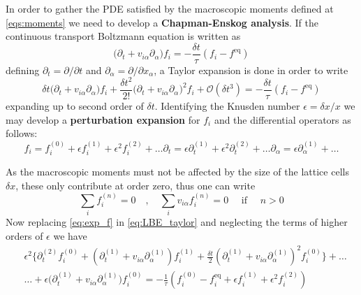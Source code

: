 In order to gather the PDE satisfied by the macroscopic moments defined at \ref{eqs:moments} we need to develop a \textbf{Chapman-Enskog analysis}. If the continuous transport Boltzmann equation is written as 
\begin{equation}\label{eq:C_LBE}
    \bigg(\partial_{t} + v_{i\alpha}\partial_\alpha\bigg)f_i = -\frac{\delta t}{\tau}(f_i - f^{\text{eq}})
\end{equation}
defining $\partial_t = \partial/\partial t$ and $\partial_\alpha = \partial/\partial x_\alpha$, a Taylor expansion is done in order to write
\begin{equation}\label{eq:LBE_taylor}
    \delta t\bigg(\partial_{t} + v_{i\alpha}\partial_\alpha\bigg)f_i + \frac{\delta t^2}{2!}\bigg(\partial_{t} + v_{i\alpha}\partial_\alpha\bigg)^2f_i + \mathcal{O}(\delta t^3) = -\frac{\delta t}{\tau}(f_i - f^{\text{eq}})
\end{equation}
expanding up to second order of $\delta t$. Identifying the Knusden number $\epsilon = \delta x/x$ %
 we may develop a \textbf{perturbation expansion} for $f_i$ and the differential operators as follows:
\begin{subequations}\label{eq:exp_f}
    \begin{equation}
        f_i = f_i^{(0)} + \epsilon f_i^{(1)} + \epsilon^2 f_i^{(2)} + \dots
    \end{equation}
    \begin{equation}
        \partial_t = \epsilon \partial_t^{(1)} + \epsilon^2 \partial_t^{(2)} + \dots
    \end{equation}
    \begin{equation}
        \partial_\alpha = \epsilon \partial_\alpha^{(1)} + \dots
    \end{equation}
\end{subequations}

As the macroscopic moments must not be affected by the size of the lattice cells $\delta x$, these only contribute at order zero, thus one can write
\begin{equation}\label{eqs:moments_order_zero}
    \sum_i f_i^{(n)} = 0 \quad, \quad\sum_i v_{i\alpha}f_i^{(n)} = 0\quad\text{ if }\quad n>0
\end{equation}
Now replacing \ref{eq:exp_f} in \ref{eq:LBE_taylor} and neglecting the terms of higher orders of $\epsilon$ we have
\begin{align}
    &\epsilon^2\bigg\{\partial_t^{(2)}f_i^{(0)}+\left(\partial_t^{(1)}+v_{i\alpha}\partial_{\alpha}^{(1)}\right)f_i^{(1)}+\frac{\delta t}{2}\left(\partial_t^{(1)}+v_{i\alpha}\partial_\alpha^{(1)}\right)^2f_i^{(0)}\bigg\}+\dots\nonumber\\
    &\dots+\epsilon\bigg(\partial_t^{(1)}+v_{i\alpha}\partial_\alpha^{(1)}\bigg)f_i^{(0)} = -\frac{1}{\tau}\left(f_i^{(0)} - f_i^{\text{eq}} + \epsilon f_i^{(1)} + \epsilon^2f_i^{(2)}\right)
\end{align}

